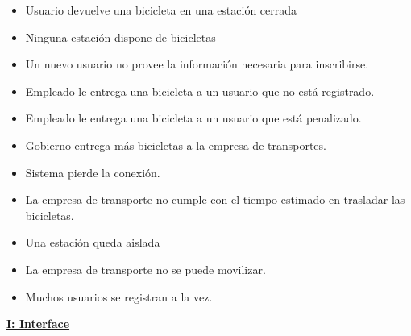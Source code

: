 \begin{itemize}
\item Usuario devuelve una bicicleta en una estación cerrada
\item Ninguna estación dispone de bicicletas
\item Un nuevo usuario no provee la información necesaria para inscribirse.
\item Empleado le entrega una bicicleta a un usuario que no está registrado.
\item Empleado le entrega una bicicleta a un usuario que está penalizado.
\item Gobierno entrega más bicicletas a la empresa de transportes.
\item Sistema pierde la conexión.
\item La empresa de transporte no cumple con el tiempo estimado en trasladar las bicicletas.
\item Una estación queda aislada
\item La empresa de transporte no se puede movilizar.
\item Muchos usuarios se registran a la vez.
\end{itemize}

\vspace{1cm}
\textbf{\underline{I: Interface}}

